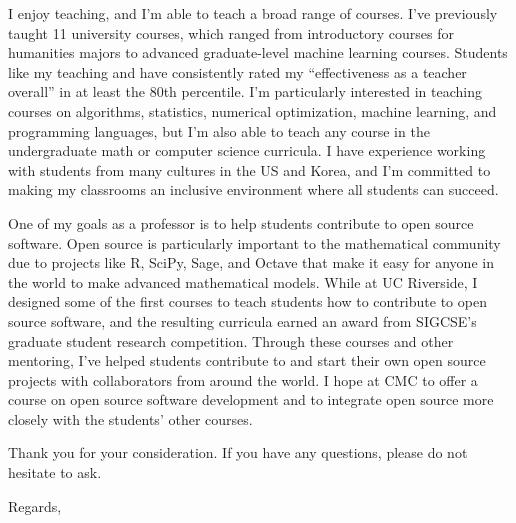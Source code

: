 \documentclass[12pt]{article}
\begin{document}

\noindent
I enjoy teaching,
and I'm able to teach a broad range of courses.
I've previously taught 11 university courses,
which ranged from introductory courses for humanities majors to advanced graduate-level machine learning courses.
Students like my teaching and have consistently rated my ``effectiveness as a teacher overall'' in at least the 80th percentile.
I'm particularly interested in teaching courses on algorithms, statistics, numerical optimization, machine learning, and programming languages,
but I'm also able to teach any course in the undergraduate math or computer science curricula.
I have experience working with students from many cultures in the US and Korea,
and I'm committed to making my classrooms an inclusive environment where all students can succeed.

\noindent
One of my goals as a professor is to help students contribute to open source software.
Open source is particularly important to the mathematical community due to  projects like R, SciPy, Sage, and Octave that make it easy for anyone in the world to make advanced mathematical models.
While at UC Riverside, I designed some of the first courses to teach students how to contribute to open source software,
and the resulting curricula earned an award from SIGCSE's graduate student research competition.
Through these courses and other mentoring, 
I've helped students contribute to and start their own open source projects with collaborators from around the world.
I hope at CMC to offer a course on open source software development
and to integrate open source more closely with the students' other courses.

\noindent
Thank you for your consideration.
If you have any questions,
please do not hesitate to ask.

\noindent
Regards,
\end{document}
